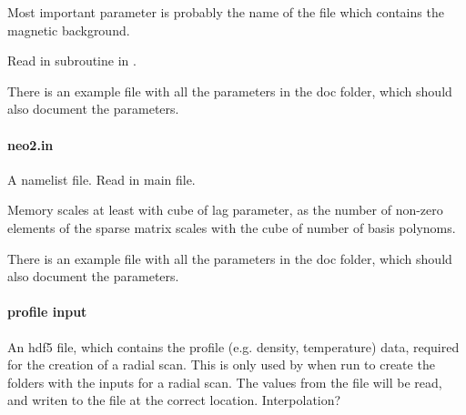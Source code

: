 Most important parameter is probably the name of the file which contains
the magnetic background.

Read in subroutine  in
.

There is an example file with all the parameters in the doc folder,
which should also document the parameters.

\paragraph{neo2.in}
A namelist file.
Read in main file.

Memory scales at least with cube of lag parameter, as the number of
non-zero elements of the sparse matrix scales with the cube of number of
basis polynoms.

There is an example file with all the parameters in the doc folder,
which should also document the parameters.

\paragraph{profile input}
An hdf5 file, which contains the profile (e.g. density, temperature)
data, required for the creation of a radial scan.
This is only used by \neotwo when run to create the folders with the
inputs for a radial scan.
The values from the file will be read, and writen to the 
file at the correct location. Interpolation?
